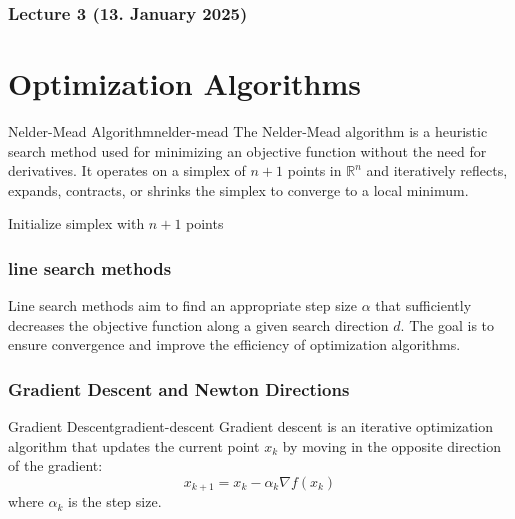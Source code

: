 \subsubsection{Lecture 3 (13. January 2025)}
\section*{Optimization Algorithms}

\begin{definition}{Nelder-Mead Algorithm}{nelder-mead}
The Nelder-Mead algorithm is a heuristic search method used for minimizing an objective function without the need for derivatives. It operates on a simplex of \( n+1 \) points in \( \mathbb{R}^n \) and iteratively reflects, expands, contracts, or shrinks the simplex to converge to a local minimum.

\end{definition}

\begin{algorithm}[H]
\caption{Nelder-Mead Algorithm}
\label{alg:nelder-mead}
Initialize simplex with $n+1$ points\;
\end{algorithm}

\subsubsection*{line search methods}
Line search methods aim to find an appropriate step size \( \alpha \) that sufficiently decreases the objective function along a given search direction \( d \). The goal is to ensure convergence and improve the efficiency of optimization algorithms.

\subsubsection*{Gradient Descent and Newton Directions}

\begin{definition}{Gradient Descent}{gradient-descent}
Gradient descent is an iterative optimization algorithm that updates the current point \( x_k \) by moving in the opposite direction of the gradient:
\[
x_{k+1} = x_k - \alpha_k \nabla f(x_k)
\]
where \( \alpha_k \) is the step size.
\end{definition}

